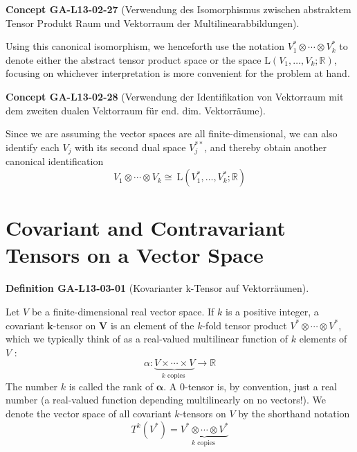 \documentclass[10pt, letterpaper]{article}
\newcommand{\CustomHeading}[3]{%
  \par\medskip\noindent%
  \textbf{#1 #2} \textnormal{(#3)}.\enskip%
}
\newenvironment{DEF}[2]{\begin{unitbox}\CustomHeading{Definition}{#1}{#2}}{\end{unitbox}}
\newenvironment{CONC}[2]{\begin{unitbox}\CustomHeading{Concept}{#1}{#2}}{\end{unitbox}}
\begin{document}
\begin{CONC}{GA-L13-02-27}{Verwendung des Isomorphismus zwischen abstraktem Tensor Produkt Raum und Vektorraum der Multilinearabbildungen}
Using this canonical isomorphism, we henceforth use the notation $V_{1}^{*} \otimes \cdots \otimes V_{k}^{*}$ to denote either the abstract tensor product space or the space $\mathrm{L}\left(V_{1}, \ldots, V_{k} ; \mathbb{R}\right)$, focusing on whichever interpretation is more convenient for the problem at hand.
\end{CONC}


\begin{CONC}{GA-L13-02-28}{Verwendung der Identifikation von Vektorraum mit dem zweiten dualen Vektorraum für end. dim. Vektorräume}
Since we are assuming the vector spaces are all finite-dimensional, we can also identify each $V_{j}$ with its second dual space $V_{j}^{* *}$, and thereby obtain another canonical identification
$$
V_{1} \otimes \cdots \otimes V_{k} \cong \mathrm{~L}\left(V_{1}^{*}, \ldots, V_{k}^{*} ; \mathbb{R}\right)
$$
\end{CONC}



\pagebreak



\section*{Covariant and Contravariant Tensors on a Vector Space}



\begin{DEF}{GA-L13-03-01}{Kovarianter k-Tensor auf Vektorräumen}
Let $V$ be a finite-dimensional real vector space. If $k$ is a positive integer, a covariant $\boldsymbol{k}$-tensor on $\boldsymbol{V}$ is an element of the $k$-fold tensor product $V^{*} \otimes \cdots \otimes V^{*}$, which we typically think of as a real-valued multilinear function of $k$ elements of $V$ :
$$
\alpha: \underbrace{V \times \cdots \times V}_{k \text { copies }} \rightarrow \mathbb{R}
$$
The number $k$ is called the rank of $\boldsymbol{\alpha}$. A 0-tensor is, by convention, just a real number (a real-valued function depending multilinearly on no vectors!). We denote the vector space of all covariant $k$-tensors on $V$ by the shorthand notation
$$
T^{k}\left(V^{*}\right)=\underbrace{V^{*} \otimes \cdots \otimes V^{*}}_{k \text { copies }}
$$
\end{DEF}
\end{document}
